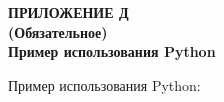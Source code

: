 \clearpage
{}%
\par

\normalsize
\begin{center}
  \textbf{ПРИЛОЖЕНИЕ Д} \\
  \textbf{(Обязательное)} \\
  \textbf{Пример использования Python}
\end{center}

Пример использования Python:

% 


\pdfpagewidth=210mm
\pdfpageheight=297mm